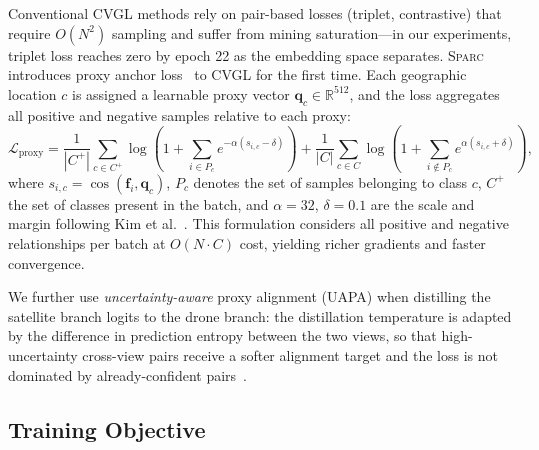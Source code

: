 \documentclass[sigconf, anonymous, review]{acmart}
\newcommand{\ours}{\textsc{Sparc}}
\newcommand{\reals}{\mathbb{R}}
\newcommand{\loss}{\mathcal{L}}
\begin{document}
Conventional CVGL methods rely on pair-based losses (triplet, contrastive) that require $O(N^2)$ sampling and suffer from mining saturation---in our experiments, triplet loss reaches zero by epoch 22 as the embedding space separates.
\ours{} introduces proxy anchor loss~\cite{kim2020proxy} to CVGL for the first time.
Each geographic location $c$ is assigned a learnable proxy vector $\mathbf{q}_c \in \reals^{512}$, and the loss aggregates all positive and negative samples relative to each proxy:
\begin{equation}
\loss_\text{proxy} = \frac{1}{|C^+|}\!\sum_{c \in C^+}\!\log\!\left(1 + \sum_{i \in P_c} e^{-\alpha(s_{i,c} - \delta)}\right) + \frac{1}{|C|}\!\sum_{c \in C}\!\log\!\left(1 + \sum_{i \notin P_c} e^{\alpha(s_{i,c} + \delta)}\right),
\label{eq:proxy}
\end{equation}
where $s_{i,c} = \cos(\mathbf{f}_i, \mathbf{q}_c)$, $P_c$ denotes the set of samples belonging to class $c$, $C^+$ the set of classes present in the batch, and $\alpha{=}32$, $\delta{=}0.1$ are the scale and margin following Kim et al.~\cite{kim2020proxy}.
This formulation considers all positive and negative relationships per batch at $O(N \cdot C)$ cost, yielding richer gradients and faster convergence.

We further use \emph{uncertainty-aware} proxy alignment (UAPA) when distilling the satellite branch logits to the drone branch: the distillation temperature is adapted by the difference in prediction entropy between the two views, so that high-uncertainty cross-view pairs receive a softer alignment target and the loss is not dominated by already-confident pairs~\cite{kim2020proxy}.

\subsection{Training Objective}
\label{sec:objective}
\end{document}
